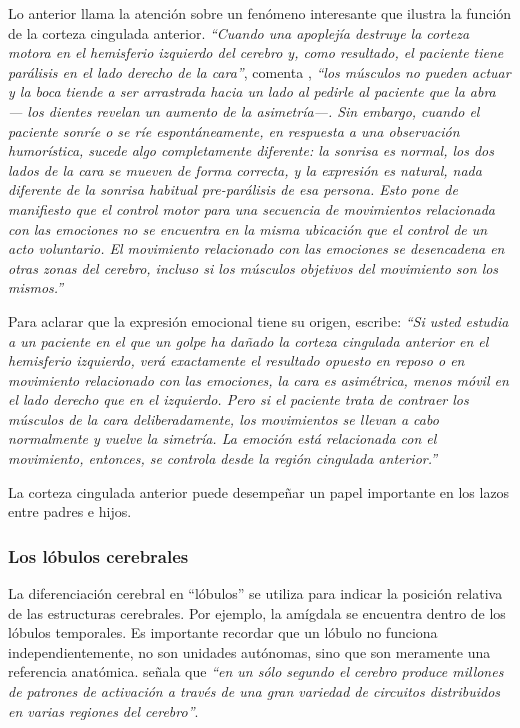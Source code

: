 Lo anterior llama la atención sobre un fenómeno interesante que ilustra la función de la corteza cingulada anterior. {\it ``Cuando una apoplejía destruye la corteza motora en el hemisferio izquierdo del cerebro y, como resultado, el paciente tiene parálisis en el lado derecho de la cara''}, comenta \cite{Damasio1994}, {\it ``los músculos no pueden actuar y la boca tiende a ser arrastrada hacia un lado al pedirle al paciente que la abra --- los dientes revelan un aumento de la asimetría---. Sin embargo, cuando el paciente sonríe o se ríe espontáneamente, en respuesta a una observación humorística, sucede algo completamente diferente: la sonrisa es normal, los dos lados de la cara se mueven de forma correcta, y la expresión es natural, nada diferente de la sonrisa habitual pre-parálisis de esa persona. Esto pone de manifiesto que el control motor para una secuencia de movimientos relacionada con las emociones no se encuentra en la misma ubicación que el control de un acto voluntario. El movimiento relacionado con las emociones se desencadena en otras zonas del cerebro, incluso si los músculos objetivos del movimiento son los mismos.''}

Para aclarar que la expresión emocional tiene su origen, \cite{Damasio1994} escribe: {\it ``Si usted estudia a un paciente en el que un golpe ha dañado la corteza cingulada anterior en el hemisferio izquierdo, verá exactamente el resultado opuesto en reposo o en movimiento relacionado con las emociones, la cara es asimétrica, menos móvil en el lado derecho que en el izquierdo. Pero si el paciente trata de contraer los músculos de la cara deliberadamente, los movimientos se llevan a cabo normalmente y vuelve la simetría. La emoción está relacionada con el movimiento, entonces, se controla desde la región cingulada anterior.''}

La corteza cingulada anterior puede desempeñar un papel importante en los lazos entre padres e hijos.

\subsubsection{Los lóbulos cerebrales}
\label{sec:lobulos}
La diferenciación cerebral en ``lóbulos'' se utiliza para indicar la posición relativa de las estructuras cerebrales. Por ejemplo, la amígdala se encuentra dentro de los lóbulos temporales. Es importante recordar que un lóbulo no funciona independientemente, no son unidades autónomas, sino que son meramente una referencia anatómica. \cite{Damasio1994} señala que {\it ``en un sólo segundo el cerebro produce millones de patrones de activación a través de una gran variedad de circuitos distribuidos en varias regiones del cerebro''}.

